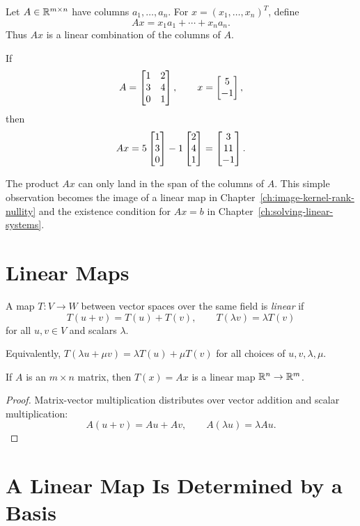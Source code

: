 Let $A\in\mathbb{R}^{m\times n}$ have columns $a_1,\ldots,a_n$. For
$x=(x_1,\ldots,x_n)^T$, define
\[
  Ax=x_1a_1+\cdots+x_na_n.
\]
Thus $Ax$ is a linear combination of the columns of $A$.

\begin{example}
If
\[
  A=\begin{bmatrix}1&2\\3&4\\0&1\end{bmatrix},\qquad x=\begin{bmatrix}5\\-1\end{bmatrix},
\]
then
\[
  Ax=5\begin{bmatrix}1\\3\\0\end{bmatrix}-1\begin{bmatrix}2\\4\\1\end{bmatrix}
    =\begin{bmatrix}3\\11\\-1\end{bmatrix}.
\]
\end{example}

\begin{remark}
The product $Ax$ can only land in the span of the columns of $A$. This simple
observation becomes the image of a linear map in Chapter~\ref{ch:image-kernel-rank-nullity}
and the existence condition for $Ax=b$ in Chapter~\ref{ch:solving-linear-systems}.
\end{remark}

\section{Linear Maps}

\begin{definition}
  A map $T:V\to W$ between vector spaces over the same field is \emph{linear}
  if
  \[
    T(u+v)=T(u)+T(v),
    \qquad
    T(\lambda v)=\lambda T(v)
  \]
  for all $u,v\in V$ and scalars $\lambda$.
\end{definition}

Equivalently, $T(\lambda u+\mu v)=\lambda T(u)+\mu T(v)$ for all choices of
$u,v,\lambda,\mu$.

\begin{proposition}
  If $A$ is an $m\times n$ matrix, then $T(x)=Ax$ is a linear map
  $\mathbb{R}^n\to\mathbb{R}^m$.
\end{proposition}

\begin{proof}
  Matrix-vector multiplication distributes over vector addition and scalar
  multiplication:
  \[
    A(u+v)=Au+Av,\qquad A(\lambda u)=\lambda Au.
  \]
\end{proof}

\section{A Linear Map Is Determined by a Basis}

